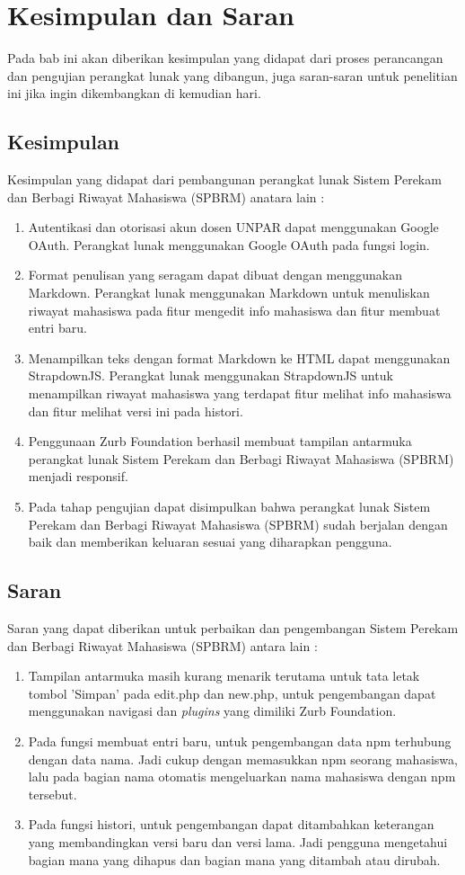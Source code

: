 \chapter{Kesimpulan dan Saran}
\label{chap:kesimpulandansaran}

Pada bab ini akan diberikan kesimpulan yang didapat dari proses perancangan dan
pengujian perangkat lunak yang dibangun, juga saran-saran untuk penelitian ini
jika ingin dikembangkan di kemudian hari.

\section{Kesimpulan}
\label{sec:kesimpulan}
Kesimpulan yang didapat dari pembangunan perangkat lunak Sistem Perekam dan Berbagi Riwayat Mahasiswa (SPBRM) anatara lain :
\begin{enumerate}[(1)]
  \item Autentikasi dan otorisasi akun dosen UNPAR dapat menggunakan Google OAuth. Perangkat lunak menggunakan Google OAuth pada fungsi login. 
  \item Format penulisan yang seragam dapat dibuat dengan menggunakan Markdown. Perangkat lunak menggunakan Markdown untuk menuliskan riwayat mahasiswa pada fitur mengedit info mahasiswa dan fitur membuat entri baru.
  \item Menampilkan teks dengan format Markdown ke HTML dapat menggunakan StrapdownJS. Perangkat lunak menggunakan StrapdownJS untuk menampilkan riwayat mahasiswa yang terdapat fitur melihat info mahasiswa dan fitur melihat versi ini pada histori.
  \item Penggunaan Zurb Foundation berhasil membuat tampilan antarmuka perangkat
  lunak Sistem Perekam dan Berbagi Riwayat Mahasiswa (SPBRM) menjadi responsif.
  \item Pada tahap pengujian dapat disimpulkan bahwa perangkat lunak Sistem
  Perekam dan Berbagi Riwayat Mahasiswa (SPBRM) sudah berjalan dengan baik dan memberikan
  keluaran sesuai yang diharapkan pengguna.
\end{enumerate}

\section{Saran}
\label{sec:saran}
Saran yang dapat diberikan untuk perbaikan dan pengembangan Sistem Perekam dan Berbagi Riwayat Mahasiswa (SPBRM) antara lain :
\begin{enumerate}[(1)]
  \item Tampilan antarmuka masih kurang menarik terutama untuk tata letak tombol 'Simpan' pada edit.php dan new.php, untuk pengembangan dapat menggunakan navigasi dan {\it plugins} yang dimiliki Zurb Foundation.
  \item Pada fungsi membuat entri baru, untuk pengembangan data npm terhubung dengan data nama. Jadi cukup dengan memasukkan npm seorang mahasiswa, lalu pada bagian nama otomatis mengeluarkan nama mahasiswa dengan npm tersebut.
  \item Pada fungsi histori, untuk pengembangan dapat ditambahkan keterangan yang
  membandingkan versi baru dan versi lama. Jadi pengguna mengetahui bagian mana
  yang dihapus dan bagian mana yang ditambah atau dirubah.
\end{enumerate}